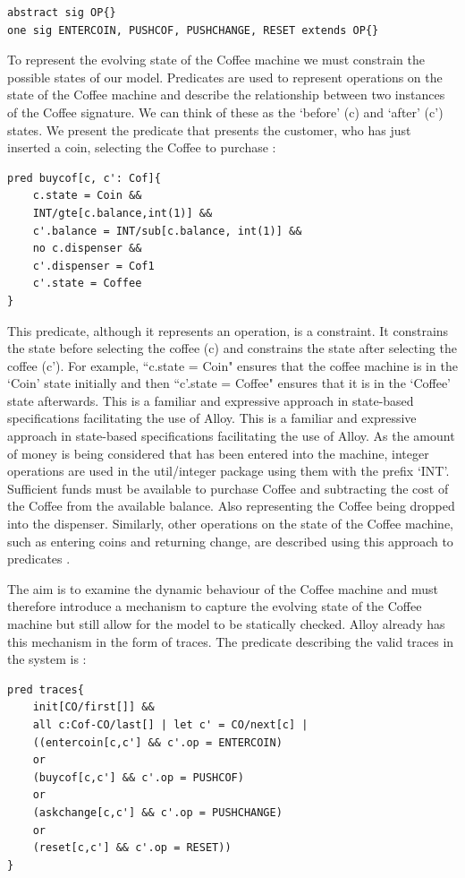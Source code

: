 \documentclass[a4paper,10pt]{report}
\begin{document}
\begin{verbatim}	
abstract sig OP{}
one sig ENTERCOIN, PUSHCOF, PUSHCHANGE, RESET extends OP{}
\end{verbatim}

To represent the evolving state of the Coffee machine we must constrain the possible states of our model. Predicates are used to represent operations on the state of the Coffee machine and describe the relationship between two instances of the Coffee signature. We can think of these as the `before' (c) and `after' (c') states. We present the predicate that presents the customer, who has just inserted a coin, selecting the Coffee to purchase \cite{Boyatt}:

\begin{verbatim}
pred buycof[c, c': Cof]{
	c.state = Coin && 
	INT/gte[c.balance,int(1)] &&
	c'.balance = INT/sub[c.balance, int(1)] &&
	no c.dispenser &&
	c'.dispenser = Cof1
	c'.state = Coffee
}
\end{verbatim}

This predicate, although it represents an operation, is a constraint. It constrains the state before selecting the coffee (c) and constrains the state after selecting the coffee (c'). For example, ``c.state = Coin" ensures that the coffee machine is in the `Coin’ state initially and then ``c'.state = Coffee" ensures that it is in the `Coffee' state afterwards. This is a familiar and expressive approach in state-based specifications facilitating the use of Alloy. This is a familiar and expressive approach in state-based specifications facilitating the use of Alloy. As the amount of money is being considered that has been entered into the machine, integer operations are used in the util/integer package using them with the prefix `INT’. Sufficient funds must be available to purchase Coffee and subtracting the cost of the Coffee from the available balance. Also representing the Coffee being dropped into the dispenser. Similarly, other operations on the state of the Coffee machine, such as entering coins and returning change, are described using this approach to predicates \cite{Boyatt}.

The aim is to examine the dynamic behaviour of the Coffee machine and must therefore introduce a mechanism to capture the evolving state of the Coffee machine but still allow for the model to be statically checked. Alloy already has this mechanism in the form of traces. The predicate describing the valid traces in the system is \cite{Boyatt}:

\begin{verbatim}
pred traces{
	init[CO/first[]] &&
	all c:Cof-CO/last[] | let c' = CO/next[c] |
	((entercoin[c,c'] && c'.op = ENTERCOIN)
	or
	(buycof[c,c'] && c'.op = PUSHCOF)
	or
	(askchange[c,c'] && c'.op = PUSHCHANGE)
	or
	(reset[c,c'] && c'.op = RESET))
}
\end{verbatim}
\end{document}
